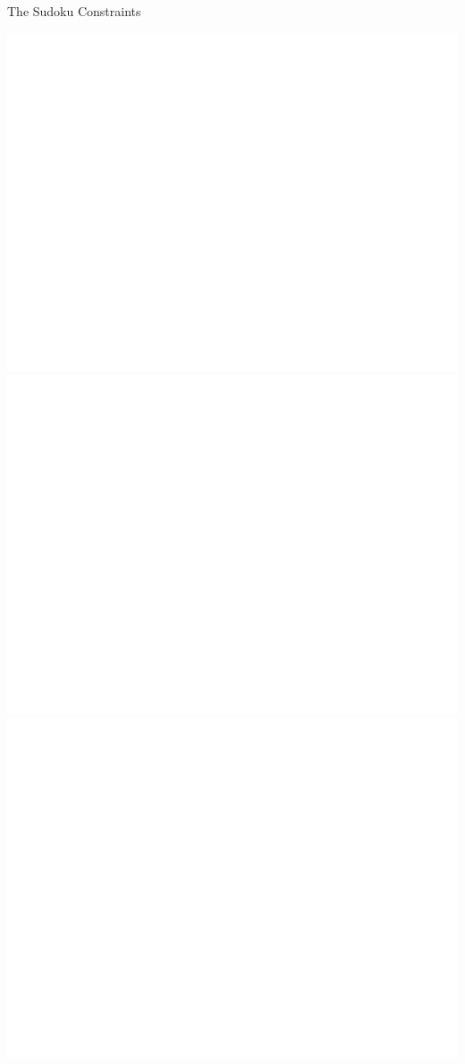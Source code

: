 \documentclass{beamer}
\begin{document}
\begin{frame}{The Sudoku Constraints}
\begin{overprint}
 \includegraphics[width=\textwidth]{isvalid1}
 \includegraphics[width=\textwidth]{isvalid2}
 \includegraphics[width=\textwidth]{isvalid3}

\end{overprint}
\end{frame}
\end{document}
